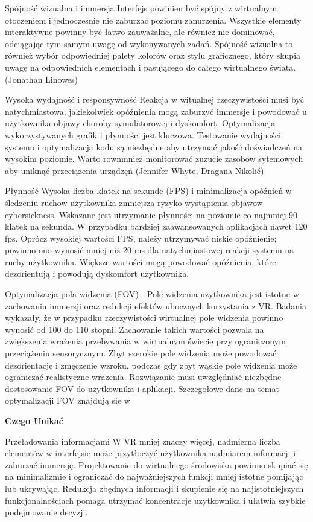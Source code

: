 Spójność wizualna i immersja
Interfejs powinien być spójny z wirtualnym otoczeniem i jednocześnie nie zaburzać poziomu zanurzenia. Wszystkie elementy interaktywne powinny być łatwo zauważalne, ale również nie dominować, odciągając tym samym uwagę od wykonywanych zadań.
Spójność wizualna to również wybór odpowiedniej palety kolorów oraz stylu graficznego, który skupia uwagę na odpowiednich elementach i pasującego do całego wirtualnego świata.
(Jonathan Linowes)

Wysoka wydajność i responsywność
Reakcja w witualnej rzeczywistości musi być natychmiastowa, jakiekolwiek opóźnienia mogą zaburzyć immersje i powodować u użytkownika objawy choroby symulatorowej i dyskomfort. Optymalizacja wykorzystywanych grafik i płynności jest kluczowa. Testowanie wydajności systemu i optymalizacja kodu są niezbędne aby  utrzymać jakość doświadczeń na wysokim poziomie. Warto rownmnież monitorować zuzucie zasobow sytemowych aby uniknąć przeciążenia urządzęń (Jennifer Whyte, Dragana Nikolić)

Płynność
Wysoka liczba klatek na sekunde (FPS) i minimalizacja opóźnień w śledzeniu ruchow użytkownika zmniejsza ryzyko wystąpienia objawow cybersickness. Wskazane jest utrzymanie płynności na poziomie co najmniej 90 klatek na sekunda. W przypadku bardziej zaawansowanych aplikacjach  nawet 120 fps. Oprócz wysokiej wartości FPS, należy utrzymywać niskie opóźnienie; powinno ono wynosić mniej niż 20 ms dla natychmiastowej reakcji systemu na ruchy użytkownika. Większe wartości mogą powodować opóźnienia, które dezorientują i powodują dyskomfort użytkownika.

Optymalizacja pola widzenia (FOV) - Pole widzenia użytkownika jest istotne w zachowaniu immersji oraz redukcji efektów ubocznych korzystania z VR. Badania wykazały, że w przypadku rzeczywistości wirtualnej pole widzenia powinno wynosić od 100 do 110 stopni. Zachowanie takich wartości pozwala na zwiększenia wrażenia przebywania w wirtualnym świecie przy ograniczonym przeciążeniu sensorycznym. Zbyt szerokie pole widzenia może powodować dezorientację i zmęczenie wzroku, podczas gdy zbyt wąskie pole widzenia może ograniczać realistyczne wrażenia. Rozwiązanie musi uwzględniać niezbędne dostosowanie FOV do użytkownika i aplikacji. Szczegołowe dane na temat optymalizacji FOV znajdują sie w %


\textbf{Czego Unikać}

Przeładowania informacjami
W VR mniej znaczy więcej, nadmierna liczba elementów w interfejsie może przytłoczyć użytkownika nadmiarem informacji i zaburzać immersję. Projektowanie do wirtualnego środowiska powinno skupiać się na minimalizmie i ograniczać do najważniejszych funkcji mniej istotne pomijając lub ukrywając. Redukcja zbędnych informacji i skupienie się na najistotniejszych funkcjonalnościach pomaga utrzymać koncentracje uzytkownika i ułatwia szybkie podejmowanie decyzji.

